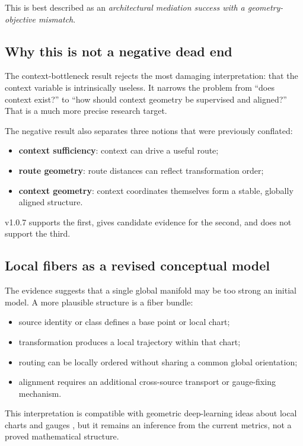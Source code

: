 \documentclass[11pt,a4paper]{article}
\begin{document}
This is best described as an \emph{architectural mediation success with a geometry-objective mismatch}.

\subsection{Why this is not a negative dead end}

The context-bottleneck result rejects the most damaging interpretation: that the context variable is intrinsically useless. It narrows the problem from ``does context exist?'' to ``how should context geometry be supervised and aligned?'' That is a much more precise research target.

The negative result also separates three notions that were previously conflated:

\begin{itemize}
\item \textbf{context sufficiency}: context can drive a useful route;
\item \textbf{route geometry}: route distances can reflect transformation order;
\item \textbf{context geometry}: context coordinates themselves form a stable, globally aligned structure.
\end{itemize}

v1.0.7 supports the first, gives candidate evidence for the second, and does not support the third.

\subsection{Local fibers as a revised conceptual model}

The evidence suggests that a single global manifold may be too strong an initial model. A more plausible structure is a fiber bundle:

\begin{itemize}
\item source identity or class defines a base point or local chart;
\item transformation produces a local trajectory within that chart;
\item routing can be locally ordered without sharing a common global orientation;
\item alignment requires an additional cross-source transport or gauge-fixing mechanism.
\end{itemize}

This interpretation is compatible with geometric deep-learning ideas about local charts and gauges \citep{bronstein2021geometric}, but it remains an inference from the current metrics, not a proved mathematical structure.
\end{document}
